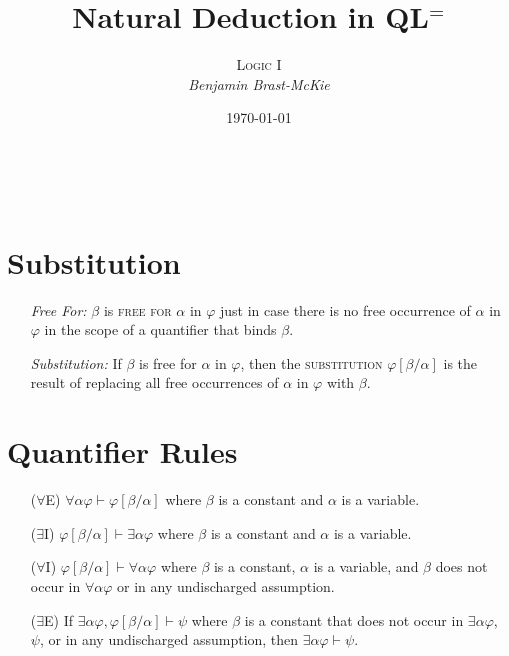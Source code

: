 \documentclass[a4paper, 11pt]{article} %
\title{\textbf{Natural Deduction in QL$^=$}} %
\author{\textsc{Logic I}\\ \em Benjamin Brast-McKie} %
\date{\today} %
\makeatletter
\newcommand{\unisub}[2]{[#1/#2]}
\renewcommand{\maketitle}{ %
\begin{flushright} %
{\LARGE\@title} %

\vspace{10pt} %

{\@author} %
\\\@date %

\vspace{0pt} %
\end{flushright}
}
\makeatother
\begin{document}
\maketitle %

\thispagestyle{empty}



\section*{Substitution}

\begin{enumerate}
  \item[\it Free For:] $\beta$ is \textsc{free for} $\alpha$ in $\varphi$ just in case there is no free occurrence of $\alpha$ in $\varphi$ in the scope of a quantifier that binds $\beta$. 
  \item[\it Substitution:] If $\beta$ is free for $\alpha$ in $\varphi$, then the \textsc{substitution} $\varphi\unisub{\beta}{\alpha}$ is the result of replacing all free occurrences of $\alpha$ in $\varphi$ with $\beta$.
\end{enumerate}
   






\section*{Quantifier Rules}

\begin{enumerate}
  \item[($\forall$E)] $\forall\alpha\varphi \vdash \varphi\unisub{\beta}{\alpha}$ where $\beta$ is a constant and $\alpha$ is a variable. 
  \item[($\exists$I)] $\varphi\unisub{\beta}{\alpha} \vdash \exists\alpha\varphi$ where $\beta$ is a constant and $\alpha$ is a variable.
  \item[($\forall$I)] $\varphi\unisub{\beta}{\alpha} \vdash \forall\alpha\varphi$ where $\beta$ is a constant, $\alpha$ is a variable, and $\beta$ does not occur in $\forall\alpha\varphi$ or in any undischarged assumption.
  \item[($\exists$E)] If $\exists\alpha\varphi,\varphi\unisub{\beta}{\alpha} \vdash \psi$ where $\beta$ is a constant that does not occur in $\exists\alpha\varphi$, $\psi$, or in any undischarged assumption, then $\exists\alpha\varphi\vdash \psi$.
\end{enumerate}
\end{document}
